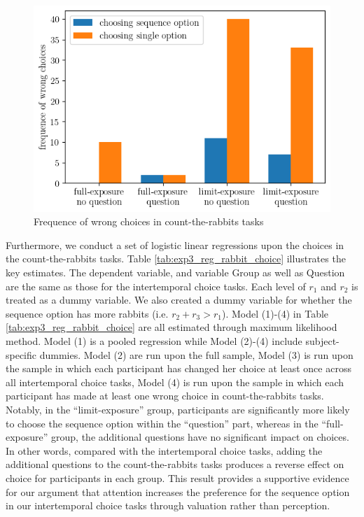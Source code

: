 \documentclass[
  12pt,
]{article}
\begin{document}
\begin{figure}
  \centering
  \includegraphics[width=0.75\linewidth]{figures/wrong_rabbit_choice.png}
  \caption{Frequence of wrong choices in count-the-rabbits tasks}
  \label{fig:exp3_wrong_rabbits}
\end{figure}

Furthermore, we conduct a set of logistic linear regressions upon the
choices in the count-the-rabbits tasks. Table
\ref{tab:exp3_reg_rabbit_choice} illustrates the key estimates. The
dependent variable, and variable Group as well as Question are the same
as those for the intertemporal choice tasks. Each level of \(r_1\) and
\(r_2\) is treated as a dummy variable. We also created a dummy variable
for whether the sequence option has more rabbits (i.e.
\(r_2 + r_3 > r_1\)). Model (1)-(4) in Table
\ref{tab:exp3_reg_rabbit_choice} are all estimated through maximum
likelihood method. Model (1) is a pooled regression while Model (2)-(4)
include subject-specific dummies. Model (2) are run upon the full
sample, Model (3) is run upon the sample in which each participant has
changed her choice at least once across all intertemporal choice tasks,
Model (4) is run upon the sample in which each participant has made at
least one wrong choice in count-the-rabbits tasks. Notably, in the
``limit-exposure'' group, participants are significantly more likely to
choose the sequence option within the ``question'' part, whereas in the
``full-exposure'' group, the additional questions have no significant
impact on choices. In other words, compared with the intertemporal
choice tasks, adding the additional questions to the count-the-rabbits
tasks produces a reverse effect on choice for participants in each
group. This result provides a supportive evidence for our argument that
attention increases the preference for the sequence option in our
intertemporal choice tasks through valuation rather than perception.
\end{document}
